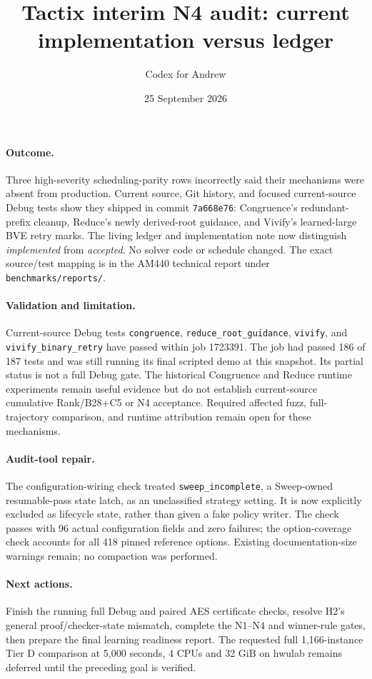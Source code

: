 \documentclass[11pt]{article}
\title{Tactix interim N4 audit: current implementation versus ledger}
\author{Codex for Andrew}
\date{25 September 2026}
\begin{document}
\maketitle

\paragraph{Outcome.} Three high-severity scheduling-parity rows incorrectly
said their mechanisms were absent from production. Current source, Git
history, and focused current-source Debug tests show they shipped in commit
\texttt{7a668e76}: Congruence's redundant-prefix cleanup, Reduce's newly
derived-root guidance, and Vivify's learned-large BVE retry marks. The living
ledger and implementation note now distinguish \emph{implemented} from
\emph{accepted}. No solver code or schedule changed. The exact source/test
mapping is in the AM440 technical report under \texttt{benchmarks/reports/}.

\paragraph{Validation and limitation.} Current-source Debug tests
\texttt{congruence}, \texttt{reduce\_root\_guidance}, \texttt{vivify}, and
\texttt{vivify\_binary\_retry} have passed within job 1723391. The job had
passed 186 of 187 tests and was still running its final scripted demo at this
snapshot. Its partial status is not a full Debug gate. The historical
Congruence and Reduce runtime experiments remain useful evidence but do not
establish current-source cumulative Rank/B28+C5 or N4 acceptance. Required
affected fuzz, full-trajectory comparison, and runtime attribution remain
open for these mechanisms.

\paragraph{Audit-tool repair.} The configuration-wiring check treated
\texttt{sweep\_incomplete}, a Sweep-owned resumable-pass state latch, as an
unclassified strategy setting. It is now explicitly excluded as lifecycle
state, rather than given a fake policy writer. The check passes with 96 actual
configuration fields and zero failures; the option-coverage check accounts
for all 418 pinned reference options. Existing documentation-size warnings
remain; no compaction was performed.

\paragraph{Next actions.} Finish the running full Debug and paired AES
certificate checks, resolve H2's general proof/checker-state mismatch,
complete the N1--N4 and winner-rule gates, then prepare the final learning
readiness report. The requested full 1,166-instance Tier D comparison at
5,000 seconds, 4 CPUs and 32 GiB on hwulab remains deferred until the
preceding goal is verified.
\end{document}

